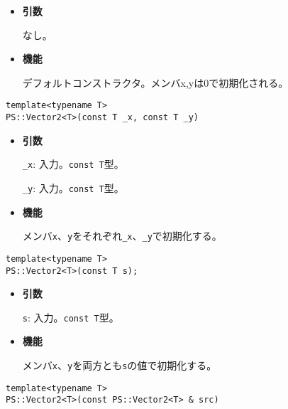 \begin{itemize}

\item{{\bf 引数}}

なし。

\item{{\bf 機能}}

デフォルトコンストラクタ。メンバx,yは0で初期化される。

\end{itemize}

\begin{screen}
\begin{verbatim}
template<typename T>
PS::Vector2<T>(const T _x, const T _y)
\end{verbatim}
\end{screen}

\begin{itemize}

\item{{\bf 引数}}

{\tt \_x}: 入力。{\tt const T}型。

{\tt \_y}: 入力。{\tt const T}型。

\item{{\bf 機能}}

メンバ{\tt x}、{\tt y}をそれぞれ{\tt \_x}、{\tt \_y}で初期化する。

\end{itemize}

\begin{screen}
\begin{verbatim}
template<typename T>
PS::Vector2<T>(const T s);
\end{verbatim}
\end{screen}

\begin{itemize}

\item{{\bf 引数}}

{\tt s}: 入力。{\tt const T}型。

\item{{\bf 機能}}

メンバ{\tt x}、{\tt y}を両方とも{\tt s}の値で初期化する。

\end{itemize}

\begin{screen}
\begin{verbatim}
template<typename T>
PS::Vector2<T>(const PS::Vector2<T> & src)
\end{verbatim}
\end{screen}

